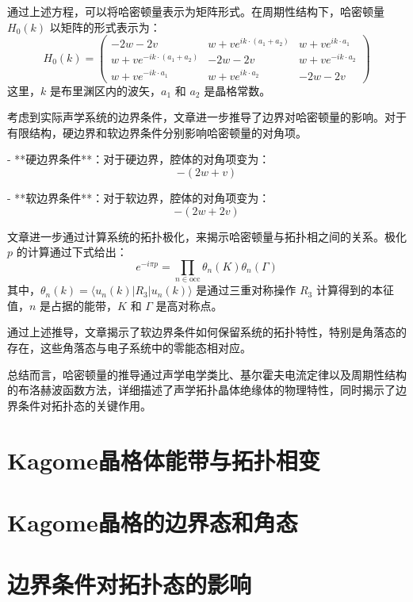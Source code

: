 通过上述方程，可以将哈密顿量表示为矩阵形式。在周期性结构下，哈密顿量 \( H_0(k) \) 以矩阵的形式表示为：
\[
H_0(k) =
\begin{pmatrix}
-2w - 2v & w + v e^{i k \cdot (a_1 + a_2)} & w + v e^{i k \cdot a_1} \\
w + v e^{-i k \cdot (a_1 + a_2)} & -2w - 2v & w + v e^{-i k \cdot a_2} \\
w + v e^{-i k \cdot a_1} & w + v e^{i k \cdot a_2} & -2w - 2v
\end{pmatrix}
\]
这里，\( k \) 是布里渊区内的波矢，\( a_1 \) 和 \( a_2 \) 是晶格常数。


考虑到实际声学系统的边界条件，文章进一步推导了边界对哈密顿量的影响。对于有限结构，硬边界和软边界条件分别影响哈密顿量的对角项。

- **硬边界条件**：对于硬边界，腔体的对角项变为：
  \[
  - (2w + v)
  \]
  
- **软边界条件**：对于软边界，腔体的对角项变为：
  \[
  - (2w + 2v)
  \]


文章进一步通过计算系统的拓扑极化，来揭示哈密顿量与拓扑相之间的关系。极化 \( p \) 的计算通过下式给出：
\[
e^{-i \pi p} = \prod_{n \in \text{occ}} \theta_n(K) \theta_n(\Gamma)
\]
其中，\( \theta_n(k) = \langle u_n(k) | R_3 | u_n(k) \rangle \) 是通过三重对称操作 \( R_3 \) 计算得到的本征值，\( n \) 是占据的能带，\( K \) 和 \( \Gamma \) 是高对称点。


通过上述推导，文章揭示了软边界条件如何保留系统的拓扑特性，特别是角落态的存在，这些角落态与电子系统中的零能态相对应。

总结而言，哈密顿量的推导通过声学电学类比、基尔霍夫电流定律以及周期性结构的布洛赫波函数方法，详细描述了声学拓扑晶体绝缘体的物理特性，同时揭示了边界条件对拓扑态的关键作用。


\section{Kagome晶格体能带与拓扑相变}

\section{Kagome晶格的边界态和角态}

\section{边界条件对拓扑态的影响}